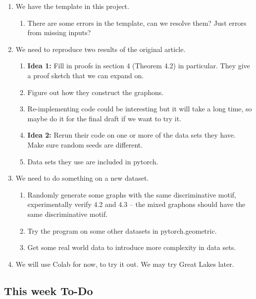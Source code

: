 \documentclass[12pt]{amsart}
\begin{document}
\begin{enumerate}
    \item We have the template in this project.
    \begin{enumerate}
        \item There are some errors in the template, can we resolve them? Just errors from missing inputs?
    \end{enumerate}
    \item We need to reproduce two results of the original article.
    \begin{enumerate}
        \item \textbf{Idea 1:} Fill in proofs in section 4 (Theorem 4.2) in particular. They give a proof sketch that we can expand on.
        \item Figure out how they construct the graphons.
        \item Re-implementing code could be interesting but it will take a long time, so maybe do it for the final draft if we want to try it.
        \item \textbf{Idea 2:} Rerun their code on one or more of the data sets they have. Make sure random seeds are different.
        \item Data sets they use are included in pytorch.
    \end{enumerate}
    \item We need to do something on a new dataset.
    \begin{enumerate}
        \item Randomly generate some graphs with the same discriminative motif, experimentally verify 4.2 and 4.3 -- the mixed graphons should have the same discriminative motif.
        \item Try the program on some other datasets in pytorch.geometric.
        \item Get some real world data to introduce more complexity in data sets.
    \end{enumerate}
    \item We will use Colab for now, to try it out. We may try Great Lakes later.
\end{enumerate}

\subsection{This week To-Do}
\end{document}
